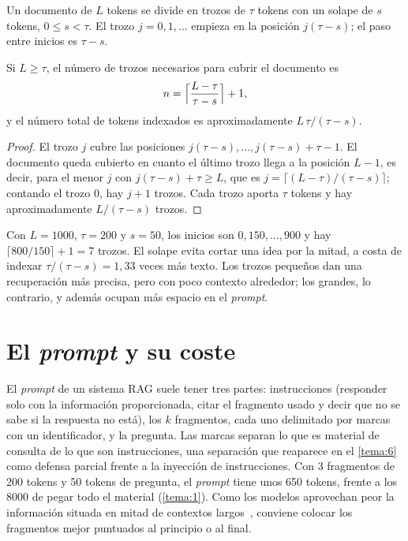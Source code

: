 \begin{definicion}\label{def:troceo}
Un documento de $L$ tokens se divide en trozos de $\tau$ tokens con un solape de $s$ tokens, $0\le s<\tau$. El trozo $j=0,1,\dots$ empieza en la posición $j(\tau-s)$; el paso entre inicios es $\tau-s$.
\end{definicion}

\begin{proposicion}\label{prop:troceo}
Si $L\ge\tau$, el número de trozos necesarios para cubrir el documento es
\[
n=\Bigl\lceil\frac{L-\tau}{\tau-s}\Bigr\rceil+1,
\]
y el número total de tokens indexados es aproximadamente $L\,\tau/(\tau-s)$.
\end{proposicion}

\begin{proof}
El trozo $j$ cubre las posiciones $j(\tau-s),\dots,j(\tau-s)+\tau-1$. El documento queda cubierto en cuanto el último trozo llega a la posición $L-1$, es decir, para el menor $j$ con $j(\tau-s)+\tau\ge L$, que es $j=\lceil(L-\tau)/(\tau-s)\rceil$; contando el trozo $0$, hay $j+1$ trozos. Cada trozo aporta $\tau$ tokens y hay aproximadamente $L/(\tau-s)$ trozos.
\end{proof}

Con $L=1000$, $\tau=200$ y $s=50$, los inicios son $0,150,\dots,900$ y hay $\lceil 800/150\rceil+1=7$ trozos. El solape evita cortar una idea por la mitad, a costa de indexar $\tau/(\tau-s)=1{,}33$ veces más texto. Los trozos pequeños dan una recuperación más precisa, pero con poco contexto alrededor; los grandes, lo contrario, y además ocupan más espacio en el \emph{prompt}.

\section{El \emph{prompt} y su coste}

El \emph{prompt} de un sistema RAG suele tener tres partes: instrucciones (responder solo con la información proporcionada, citar el fragmento usado y decir que no se sabe si la respuesta no está), los $k$ fragmentos, cada uno delimitado por marcas con un identificador, y la pregunta. Las marcas separan lo que es material de consulta de lo que son instrucciones, una separación que reaparece en el \cref{tema:6} como defensa parcial frente a la inyección de instrucciones. Con 3 fragmentos de 200 tokens y 50 tokens de pregunta, el \emph{prompt} tiene unos 650 tokens, frente a los 8000 de pegar todo el material (\cref{tema:1}). Como los modelos aprovechan peor la información situada en mitad de contextos largos~\cite{liu-lost}, conviene colocar los fragmentos mejor puntuados al principio o al final.

